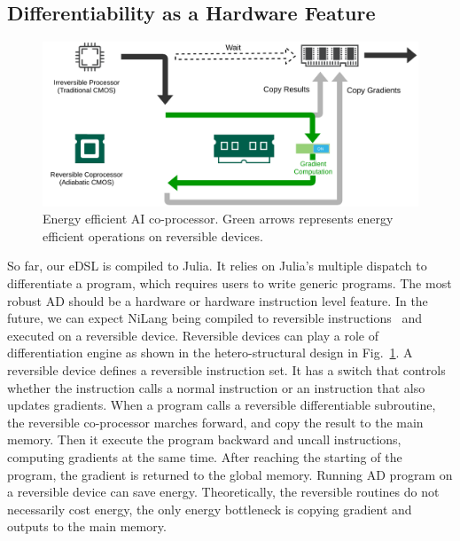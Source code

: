 \documentclass{article}
\newcommand{\<}{\langle}
\renewcommand{\>}{\rangle}
\newcommand{\Fig}[1]{Fig.~\ref{#1}}
\theoremstyle{definition}\newtheorem{definition}{\textit{Definition}}
\begin{document}
\subsection{Differentiability as a Hardware Feature}\label{sec:hardware}

\begin{figure}
    \centerline{\includegraphics[width=0.8\columnwidth,trim={0 0cm 0 0cm},clip]{hardware.pdf}}
    \caption{Energy efficient AI co-processor. Green arrows represents energy efficient operations on reversible devices.}\label{fig:hardware}
\end{figure}
So far, our eDSL is compiled to Julia.
It relies on Julia's multiple dispatch to differentiate a program, which requires users to write generic programs.
The most robust AD should be a hardware or hardware instruction level feature.
In the future, we can expect NiLang being compiled to reversible instructions~\cite{Vieri1999} and executed on a reversible device.
Reversible devices can play a role of differentiation engine as shown in the hetero-structural design in \Fig{fig:hardware}. A reversible device defines a reversible instruction set. It has a switch that controls whether the instruction calls a normal instruction or an instruction that also updates gradients.
When a program calls a reversible differentiable subroutine, the reversible co-processor marches forward, and copy the result to the main memory.
Then it execute the program backward and uncall instructions, computing gradients at the same time.
After reaching the starting of the program, the gradient is returned to the global memory.
Running AD program on a reversible device can save energy. Theoretically, the reversible routines do not necessarily cost energy, the only energy bottleneck is copying gradient and outputs to the main memory.
\end{document}
